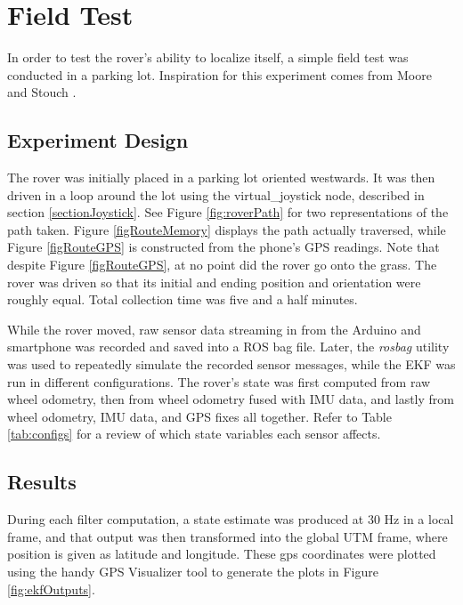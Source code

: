 \chapter{Field Test}

In order to test the rover's ability to localize itself, a simple field test was conducted in a parking lot. Inspiration for this experiment comes from Moore and Stouch \cite{robot_localization_paper}.

\section{Experiment Design}

The rover was initially placed in a parking lot oriented westwards. It was then driven in a loop around the lot using the virtual\_joystick node, described in section \ref{sectionJoystick}. See Figure \ref{fig:roverPath} for two representations of the path taken. Figure \ref{figRouteMemory} displays the path actually traversed, while Figure \ref{figRouteGPS} is constructed from the phone's GPS readings. Note that despite Figure \ref{figRouteGPS}, at no point did the rover go onto the grass. The rover was driven so that its initial and ending position and orientation were roughly equal. Total collection time was five and a half minutes.

While the rover moved, raw sensor data streaming in from the Arduino and smartphone was recorded and saved into a ROS bag file.  Later, the \textit{rosbag} utility was used to repeatedly simulate the recorded sensor messages, while the EKF was run in different configurations. The rover's state was first computed from raw wheel odometry, then from wheel odometry fused with IMU data, and lastly from wheel odometry, IMU data, and GPS fixes all together. Refer to Table \ref{tab:configs} for a review of which state variables each sensor affects.

\section{Results}


During each filter computation, a state estimate was produced at 30 Hz in a local frame, and that output was then transformed into the global UTM frame, where position is given as latitude and longitude. These gps coordinates were plotted using the handy GPS Visualizer tool \cite{gps_visualizer} to generate the plots in  Figure \ref{fig:ekfOutputs}.

